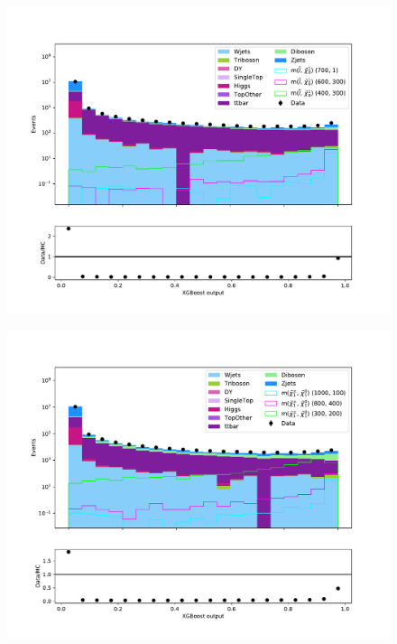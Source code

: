 \begin{figure}[H]
    \centering
        \includegraphics[width = \textwidth]{Figures/Stacked/stackedplot_BDT_High_level_slepslep.pdf}
        \caption{}
        \label{fig:traintestscaled}
\end{figure}





\begin{figure}[H]
    \centering
        \includegraphics[width = \textwidth]{Figures/Stacked/stackedplot_BDT_All_level_slepsnu.pdf}
        \caption{}
        \label{fig:traintestscaled}
\end{figure}

